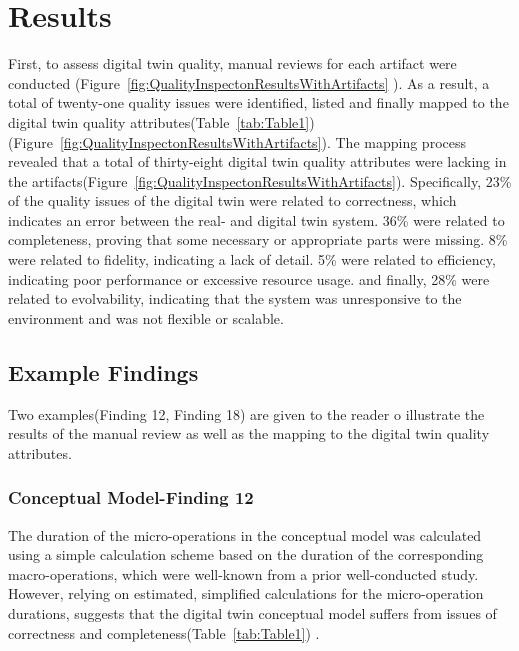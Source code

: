 \documentclass{llncs}
\begin{document}
    
    \section{Results}

    First, to assess digital twin quality,
    manual reviews for each artifact were conducted (Figure~\ref{fig:QualityInspectonResultsWithArtifacts} ). 
    As a result, a total of twenty-one quality issues were identified,
    listed and finally mapped to the digital twin quality attributes(Table~\ref{tab:Table1})(Figure~\ref{fig:QualityInspectonResultsWithArtifacts}).
    The mapping process 
    revealed that a total of thirty-eight digital twin quality attributes were 
    lacking in the artifacts(Figure~\ref{fig:QualityInspectonResultsWithArtifacts}).  
    Specifically, 23\% of the quality issues of the digital twin were related to correctness, 
    which indicates an error between the real- and digital twin system. 36\%  were related to completeness, 
    proving that some necessary or appropriate parts were missing.
    8\%  were related to fidelity, indicating a lack of detail. 
    5\%  were related to efficiency, indicating poor performance or excessive resource usage.
    and finally, 28\% were related to evolvability, indicating that the system was unresponsive to the environment and was not flexible or scalable.  

    \subsection{Example Findings}  
    Two examples(Finding 12, Finding 18) are given to the reader o illustrate 
    the results of the manual review as well as the mapping to the digital twin quality attributes. 

    \subsubsection{Conceptual Model-Finding 12}

    The duration of the micro-operations in the conceptual model was calculated using a simple calculation 
    scheme based on the duration of the corresponding macro-operations,
     which were well-known from a prior well-conducted study. 
    However, relying on estimated, 
    simplified calculations for the micro-operation durations,
    suggests that the digital twin conceptual model suffers from issues of correctness and completeness(Table~\ref{tab:Table1}) . 
\end{document}
